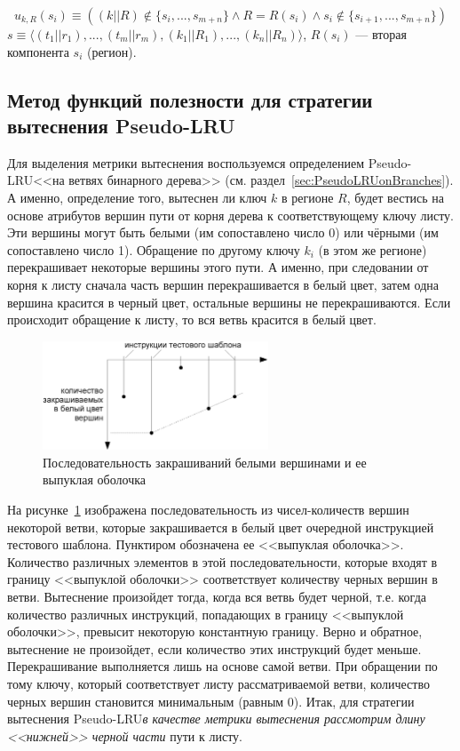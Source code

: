 \documentclass[14pt]{extreport}
\newcommand{\PseudoLRU}{\textsf{Pseudo-LRU}\xspace}
\begin{document}
$$u_{k,R}(s_i) \equiv ((k||R) \notin \{s_i, ..., s_{m+n}\} \wedge
R = R(s_i) \wedge s_i \notin\{s_{i+1},..., s_{m+n}\})$$
$s \equiv \langle (t_1||r_1), ..., (t_m||r_m), (k_1||R_1), ...,
(k_n||R_n)\rangle$, $R(s_i)$ --- вторая компонента $s_i$ (регион).


\subsection{Метод функций полезности для стратегии вытеснения \PseudoLRU}

Для выделения метрики вытеснения воспользуемся определением \PseudoLRU <<на ветвях бинарного дерева>> (см. раздел~\ref{sec:PseudoLRUonBranches}). А именно, определение того, вытеснен ли ключ $k$ в регионе $R$, будет вестись на основе атрибутов вершин пути от корня дерева к соответствующему ключу листу. Эти вершины могут быть белыми (им сопоставлено число 0) или чёрными (им сопоставлено число 1). Обращение по другому ключу $k_i$ (в этом же регионе) перекрашивает некоторые вершины этого пути. А именно, при следовании от корня к листу сначала часть вершин перекрашивается в белый цвет, затем одна вершина красится в черный цвет, остальные вершины не перекрашиваются. Если происходит обращение к листу, то вся ветвь красится в белый цвет.

\begin{figure}[h] \center
  \includegraphics[width=0.6\textwidth]{2.theor/white_feeds}
  \caption{Последовательность закрашиваний белыми вершинами и ее выпуклая оболочка}\label{fig:white-feeds}
\end{figure}

На рисунке~\ref{fig:white-feeds} изображена последовательность из чисел-количеств вершин некоторой ветви, которые закрашивается в белый цвет очередной инструкцией тестового шаблона. Пунктиром обозначена ее <<выпуклая оболочка>>. Количество различных элементов в этой последовательности, которые входят в границу <<выпуклой оболочки>> соответствует количеству черных вершин в ветви. Вытеснение произойдет тогда, когда вся ветвь будет черной, т.е. когда количество различных инструкций, попадающих в границу <<выпуклой оболочки>>, превысит некоторую константную границу. Верно и обратное, вытеснение не произойдет, если количество этих инструкций будет меньше. Перекрашивание выполняется лишь на основе самой ветви. При обращении по тому ключу, который соответствует листу рассматриваемой ветви, количество черных вершин становится минимальным (равным 0). Итак, для стратегии вытеснения \PseudoLRU \emph{в качестве метрики вытеснения рассмотрим длину <<нижней>> черной части} пути к листу.
\end{document}
